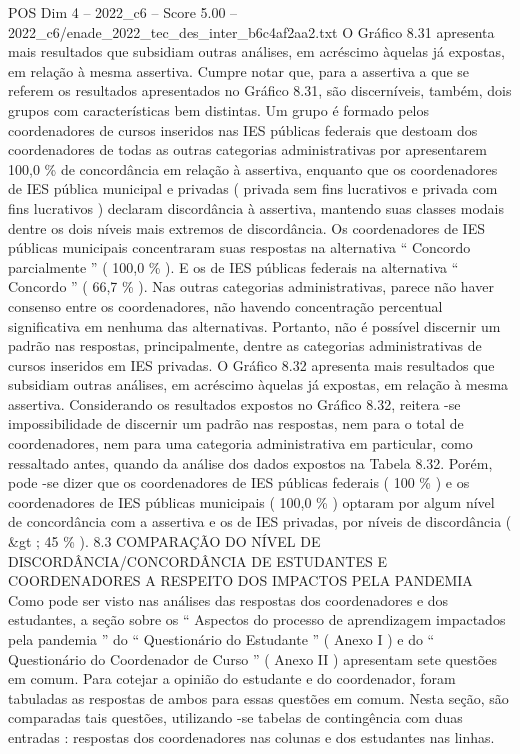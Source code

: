 \begin{textsample}{POS Dim 4 – 2022\_c6 – Score 5.00 – 2022\_c6/enade\_2022\_tec\_des\_inter\_b6c4af2aa2.txt}
O Gráfico 8.31 apresenta mais resultados que subsidiam outras análises, em acréscimo àquelas já expostas, em relação à mesma assertiva.
Cumpre notar que, para a assertiva a que se referem os resultados apresentados no Gráfico 8.31, são discerníveis, também, dois grupos com características bem distintas.
Um grupo é formado pelos coordenadores de cursos inseridos nas IES públicas federais que destoam dos coordenadores de todas as outras categorias administrativas por apresentarem 100,0 \% de concordância em relação à assertiva, enquanto que os coordenadores de IES pública municipal e privadas ( privada sem fins lucrativos e privada com fins lucrativos ) declaram discordância à assertiva, mantendo suas classes modais dentre os dois níveis mais extremos de discordância.
Os coordenadores de IES públicas municipais concentraram suas respostas na alternativa “ Concordo parcialmente ” ( 100,0 \% ).
E os de IES públicas federais na alternativa “ Concordo ” ( 66,7 \% ).
Nas outras categorias administrativas, parece não haver consenso entre os coordenadores, não havendo concentração percentual significativa em nenhuma das alternativas.
Portanto, não é possível discernir um padrão nas respostas, principalmente, dentre as categorias administrativas de cursos inseridos em IES privadas.
O Gráfico 8.32 apresenta mais resultados que subsidiam outras análises, em acréscimo àquelas já expostas, em relação à mesma assertiva.
Considerando os resultados expostos no Gráfico 8.32, reitera -se impossibilidade de discernir um padrão nas respostas, nem para o total de coordenadores, nem para uma categoria administrativa em particular, como ressaltado antes, quando da análise dos dados expostos na Tabela 8.32.
Porém, pode -se dizer que os coordenadores de IES públicas federais ( 100 \% ) e os coordenadores de IES públicas municipais ( 100,0 \% ) optaram por algum nível de concordância com a assertiva e os de IES privadas, por níveis de discordância ( \&gt ; 45 \% ). 8.3 COMPARAÇÃO DO NÍVEL DE DISCORDÂNCIA/CONCORDÂNCIA DE ESTUDANTES E COORDENADORES A RESPEITO DOS IMPACTOS PELA PANDEMIA Como pode ser visto nas análises das respostas dos coordenadores e dos estudantes, a seção sobre os “ Aspectos do processo de aprendizagem impactados pela pandemia ” do “ Questionário do Estudante ” ( Anexo I ) e do “ Questionário do Coordenador de Curso ” ( Anexo II ) apresentam sete questões em comum.
Para cotejar a opinião do estudante e do coordenador, foram tabuladas as respostas de ambos para essas questões em comum.
Nesta seção, são comparadas tais questões, utilizando -se tabelas de contingência com duas entradas : respostas dos coordenadores nas colunas e dos estudantes nas linhas.

\end{textsample}
